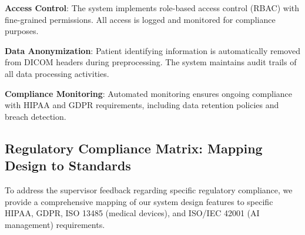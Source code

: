 \documentclass[12pt,a4paper]{article}
\begin{document}
\textbf{Access Control}: The system implements role-based access control (RBAC) with fine-grained permissions. All access is logged and monitored for compliance purposes.

\textbf{Data Anonymization}: Patient identifying information is automatically removed from DICOM headers during preprocessing. The system maintains audit trails of all data processing activities.

\textbf{Compliance Monitoring}: Automated monitoring ensures ongoing compliance with HIPAA and GDPR requirements, including data retention policies and breach detection.

\subsection{Regulatory Compliance Matrix: Mapping Design to Standards}

To address the supervisor feedback regarding specific regulatory compliance, we provide a comprehensive mapping of our system design features to specific HIPAA, GDPR, ISO 13485 (medical devices), and ISO/IEC 42001 (AI management) requirements.
\end{document}
